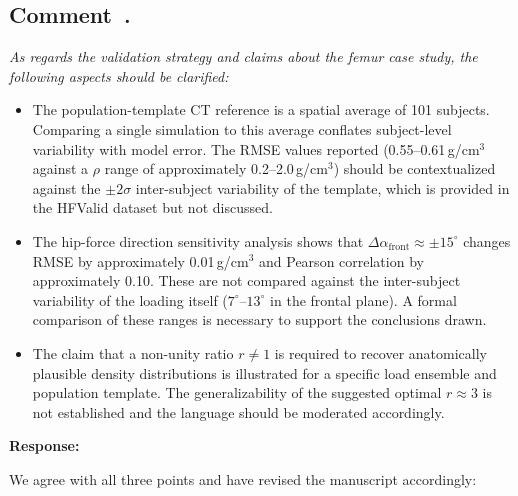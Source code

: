 \documentclass[11pt,a4paper]{article}
\newcounter{reviewer}
\newcounter{comment}[reviewer]
\newcommand{\revcomment}[1]{%
  \refstepcounter{comment}%
  \subsection*{Comment~\thereviewer.\thecomment}%
  {\color{reviewerblue}\itshape #1}%
  \medskip
}
\newcommand{\response}{%
  \par\noindent\textbf{Response:}\par\noindent\color{responseblack}%
}
\begin{document}

\revcomment{As regards the validation strategy and claims about the femur case study, the following aspects should be clarified:
\begin{itemize}[nosep]
\item The population-template CT reference is a spatial average of 101 subjects. Comparing a single simulation to this average conflates subject-level variability with model error. The RMSE values reported (0.55--0.61\,g/cm$^3$ against a $\rho$ range of approximately 0.2--2.0\,g/cm$^3$) should be contextualized against the $\pm 2\sigma$ inter-subject variability of the template, which is provided in the HFValid dataset but not discussed.
\item The hip-force direction sensitivity analysis shows that $\Delta\alpha_{\mathrm{front}} \approx \pm 15^\circ$ changes RMSE by approximately 0.01\,g/cm$^3$ and Pearson correlation by approximately 0.10. These are not compared against the inter-subject variability of the loading itself ($7^\circ$--$13^\circ$ in the frontal plane). A formal comparison of these ranges is necessary to support the conclusions drawn.
\item The claim that a non-unity ratio $r \neq 1$ is required to recover anatomically plausible density distributions is illustrated for a specific load ensemble and population template. The generalizability of the suggested optimal $r \approx 3$ is not established and the language should be moderated accordingly.
\end{itemize}}

\response
We agree with all three points and have revised the manuscript accordingly:
\end{document}
